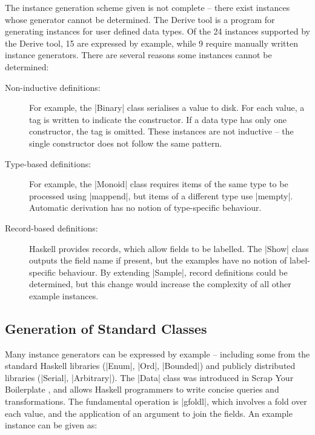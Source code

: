 \documentclass[preprint]{sigplanconf}
\begin{document}
The instance generation scheme given is not complete -- there exist instances whose generator cannot be determined. The Derive tool \cite{derive} is a program for generating instances for user defined data types. Of the 24 instances supported by the Derive tool, 15 are expressed by example, while 9 require manually written instance generators. There are several reasons some instances cannot be determined:

\begin{description}

\item[Non-inductive definitions:] For example, the |Binary| class serialises a value to disk. For each value, a tag is written to indicate the constructor. If a data type has only one constructor, the tag is omitted. These instances are not inductive -- the single constructor does not follow the same pattern.

\item[Type-based definitions:] For example, the |Monoid| class requires items of the same type to be processed using |mappend|, but items of a different type use |mempty|. Automatic derivation has no notion of type-specific behaviour.

\item [Record-based definitions:] Haskell provides records, which allow fields to be labelled. The |Show| class outputs the field name if present, but the examples have no notion of label-specific behaviour. By extending |Sample|, record definitions could be determined, but this change would increase the complexity of all other example instances.

\end{description}

\subsection{Generation of Standard Classes}
\label{sec:automatic_success}

Many instance generators can be expressed by example -- including some from the standard Haskell libraries (|Enum|, |Ord|, |Bounded|) and publicly distributed libraries (|Serial|, |Arbitrary|). The |Data| class was introduced in Scrap Your Boilerplate \cite{lammel:syb}, and allows Haskell programmers to write concise queries and transformations. The fundamental operation is |gfoldl|, which involves a fold over each value, and the application of an argument to join the fields. An example instance can be given as:
\end{document}
